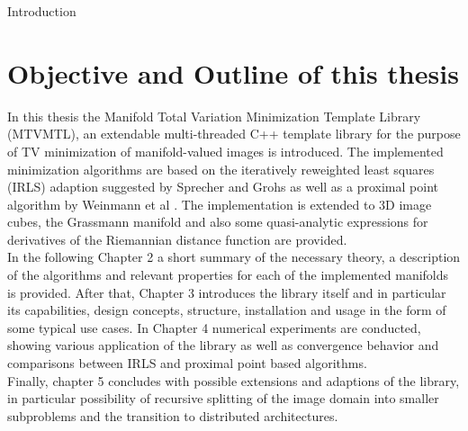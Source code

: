 \begin{chapter}{Introduction}
\section{Objective and Outline of this thesis}
In this thesis the Manifold Total Variation Minimization Template Library (MTVMTL), an extendable multi-threaded C++ template library for the purpose of TV minimization of manifold-valued images is introduced. 
The implemented minimization algorithms are based on the iteratively reweighted least squares (IRLS) adaption suggested by Sprecher and Grohs \cite{SprecherIRLS} as well as a 
proximal point algorithm by Weinmann et al \cite{Weinmann}. The implementation is extended to 3D image cubes, the Grassmann manifold and also some quasi-analytic expressions for derivatives of the Riemannian distance function are provided.\\

In the following Chapter 2 a short summary of the necessary theory, a description of the algorithms and relevant properties for each of the implemented manifolds is provided.
After that, Chapter 3 introduces the library itself and in particular its capabilities, design concepts, structure, installation and usage in the form of some typical
use cases. In Chapter 4 numerical experiments are conducted, showing various application of the library as well as convergence behavior and comparisons between 
IRLS and proximal point based algorithms.\\

Finally, chapter 5 concludes with possible extensions and adaptions of the library, in particular possibility of recursive splitting of the image domain into smaller subproblems and
the transition to distributed architectures.
\end{chapter}
